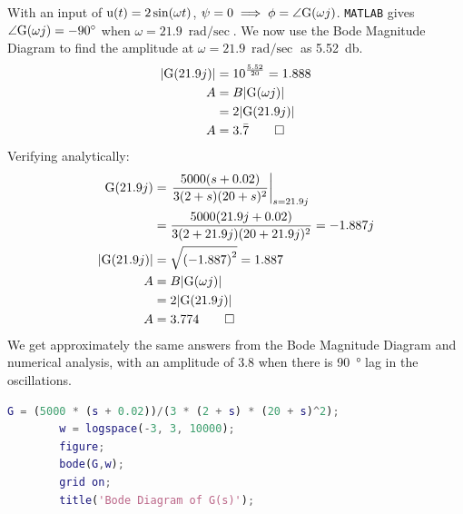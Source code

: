 \begin{hwkProblem}{3}{}
	\hwkPart{}

	With an input of \( \func{u}[t] = 2\sin(\omega t) \), \( \psi = 0  \implies \phi = \angle \func{G}[\omega j] \). \lstinline{MATLAB} gives \( \angle \func{G}[\omega j] = \qty{-90}{\degree} \) when \( \omega = \qty{21.9}{\radian\per\sec} \). We now use the Bode Magnitude Diagram to find the amplitude at \( \omega = \qty{21.9}{\radian\per\sec} \) as \qty{5.52}{\decibel}.
	\begin{align*}
		|\func{G}[21.9 j]| &= 10^{\frac{5.52}{20}} = 1.888 \\
		A &= B |\func{G}[\omega j]| \\
		  &= 2 |\func{G}[21.9 j]| \\
		A &= 3.\bar{7} \qed
	\end{align*}
	Verifying analytically:
	\begin{align*}
		\func{G}[21.9j] &= \left. \frac{5000(s+0.02)}{3(2+s)(20+s)^{2}}\right|_{s=21.9j} \\
			      &= \frac{5000(21.9j+0.02)}{3(2+21.9j)(20+21.9j)^{2}} = -1.887 j \\
		|\func{G}[21.9j]| &= \sqrt{\left(-1.887\right)^{2}} = 1.887 \\
		A &= B |\func{G}[\omega j]| \\
		  &= 2 |\func{G}[21.9 j]| \\
		A &= 3.774 \qed
	\end{align*}
	We get approximately the same answers from the Bode Magnitude Diagram and numerical analysis, with an amplitude of 3.8 when there is \qty{90}{\degree} lag in the oscillations.

	\hwkCode{}

	\begin{lstlisting}[language={matlab}, label={lst:s03}, caption={\lstinline{MATLAB} code for P03}]
		G = (5000 * (s + 0.02))/(3 * (2 + s) * (20 + s)^2);
		w = logspace(-3, 3, 10000);
		figure;
		bode(G,w);
		grid on;
		title('Bode Diagram of G(s)');
	\end{lstlisting}

\end{hwkProblem}

